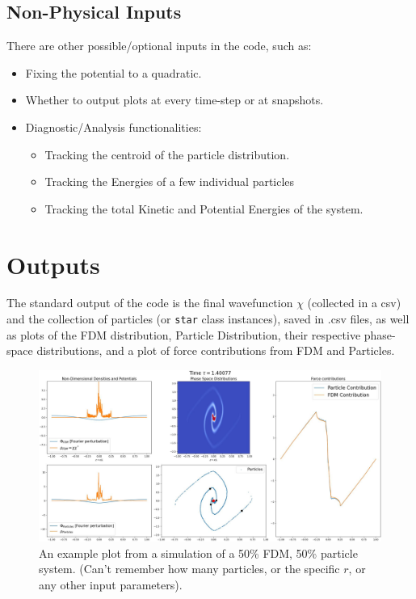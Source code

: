 \documentclass[oneside]{book}
\begin{document}
\subsection{Non-Physical Inputs}
There are other possible/optional inputs in the code, such as: 
\begin{itemize}
    \item Fixing the potential to a quadratic.
    \item Whether to output plots at every time-step or at snapshots.
    \item Diagnostic/Analysis functionalities: 
    \begin{itemize}
        \item Tracking the centroid of the particle distribution.
        \item Tracking the Energies of a few individual particles
        \item Tracking the total Kinetic and Potential Energies of the system.
    \end{itemize}
\end{itemize}

\section{Outputs}
The standard output of the code is the final wavefunction $\chi$ (collected in a csv) and the collection of particles 
(or \texttt{star} class instances), saved in .csv files, as well as plots of the FDM distribution, Particle Distribution, 
their respective phase-space distributions, and a plot of force contributions from FDM and Particles. 

\begin{figure}[h]
    \centering
    \includegraphics[width=\textwidth]{Images/ToyModelPlot0100.jpg}
    \caption{An example plot from a simulation of a 50\% FDM, 50\% particle system. (Can't remember how many particles, or the specific $r$, or any other input parameters). }
    \label{fig:my_label}
\end{figure}
\end{document}
